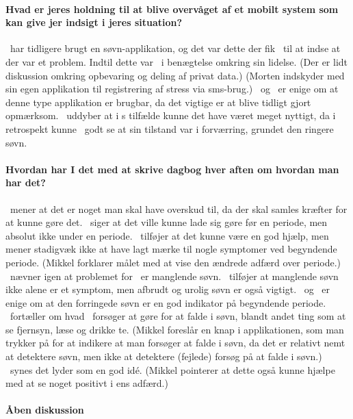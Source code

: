 \paragraph{Hvad er jeres holdning til at blive overvåget af et mobilt system som kan give jer indsigt i jeres situation?}
\pc~har tidligere brugt en søvn-applikation, og det var dette der fik \pc~til at indse at der var et problem.
Indtil dette var \pc~i benægtelse omkring sin lidelse.
(Der er lidt diskussion omkring opbevaring og deling af privat data.)
(Morten indskyder med sin egen applikation til registrering af stress via sms-brug.)
\pa~og \pe~er enige om at denne type applikation er brugbar, da det vigtige er at blive tidligt gjort opmærksom.
\pa~uddyber at i \pa s tilfælde kunne det have været meget nyttigt, da i retrospekt kunne \pa~godt se at sin tilstand var i forværring, grundet den ringere søvn.

\paragraph{Hvordan har I det med at skrive dagbog hver aften om hvordan man har det?}
\pd~mener at det er noget man skal have overskud til, da der skal samles kræfter for at kunne gøre det.
\pe~siger at det ville kunne lade sig gøre før en periode, men absolut ikke under en periode.
\pe~tilføjer at det kunne være en god hjælp, men mener stadigvæk ikke at have lagt mærke til nogle symptomer ved begyndende periode.
(Mikkel forklarer målet med at vise den ændrede adfærd over periode.)
\pa~nævner igen at problemet for \pa~er manglende søvn.
\pe~tilføjer at manglende søvn ikke alene er et symptom, men afbrudt og urolig søvn er også vigtigt.
\pe~og \pd~er enige om at den forringede søvn er en god indikator på begyndende periode.
\pa~fortæller om hvad \pa~forsøger at gøre for at falde i søvn, blandt andet ting som at se fjernsyn, læse og drikke te.
(Mikkel foreslår en knap i applikationen, som man trykker på for at indikere at man forsøger at falde i søvn, da det er relativt nemt at detektere søvn, men ikke at detektere (fejlede) forsøg på at falde i søvn.)
\pa~synes det lyder som en god idé.
(Mikkel pointerer at dette også kunne hjælpe med at se noget positivt i ens adfærd.)

\paragraph{Åben diskussion}


